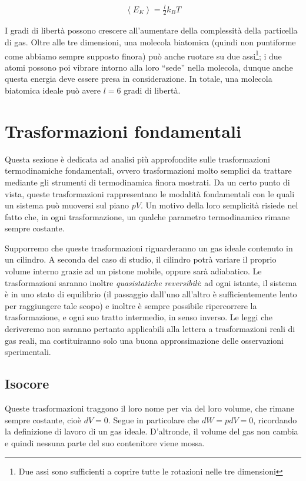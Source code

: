 \begin{align}
    \left\langle E_K \right\rangle = \frac{l}{2}k_BT
\end{align}

I gradi di libertà possono crescere all'aumentare della complessità
della particella di gas. Oltre alle tre dimensioni, una molecola
biatomica (quindi non puntiforme come abbiamo sempre supposto finora)
può anche ruotare su due assi\footnote{Due assi sono sufficienti a
coprire tutte le rotazioni nelle tre dimensioni}; i due atomi possono
poi vibrare intorno alla loro ``sede'' nella molecola, dunque anche
questa energia deve essere presa in considerazione. In totale, una
molecola biatomica ideale può avere $l = 6$ gradi di libertà.









\section{Trasformazioni fondamentali}
Questa sezione è dedicata ad analisi più approfondite sulle trasformazioni
termodinamiche fondamentali, ovvero trasformazioni molto semplici da
trattare mediante gli strumenti di termodinamica finora mostrati. Da
un certo punto di vista, queste trasformazioni rappresentano le modalità
fondamentali con le quali un sistema può muoversi sul piano $pV$. Un
motivo della loro semplicità risiede nel fatto che, in ogni trasformazione,
un qualche parametro termodinamico rimane sempre costante.

Supporremo che queste trasformazioni riguarderanno un gas ideale
contenuto in un cilindro. A seconda del caso di studio, il cilindro
potrà variare il proprio volume interno grazie ad un pistone mobile,
oppure sarà adiabatico. Le trasformazioni saranno inoltre \textit{quasistatiche
reversibili}: ad ogni istante, il sistema è in uno stato di
equilibrio (il passaggio dall'uno all'altro è sufficientemente lento
per raggiungere tale scopo) e inoltre è sempre possibile ripercorrere
la trasformazione, e ogni suo tratto intermedio, in senso inverso.
Le leggi che deriveremo non saranno pertanto applicabili alla lettera
a trasformazioni reali di gas reali, ma costituiranno solo una buona
approssimazione delle osservazioni sperimentali.


\subsection{Isocore}
Queste trasformazioni traggono il loro nome per via del loro volume,
che rimane sempre costante, cioè $dV = 0$. Segue in particolare che
$dW = pdV = 0$, ricordando la definizione di lavoro di un gas ideale.
D'altronde, il volume del gas non cambia e quindi nessuna parte del
suo contenitore viene mossa.


